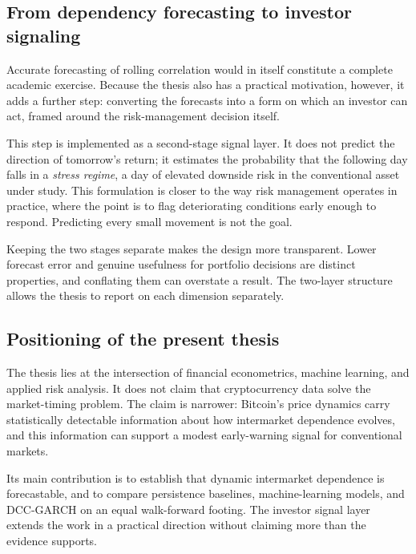 \subsection{From dependency forecasting to investor signaling}

Accurate forecasting of rolling correlation would in itself constitute a complete academic exercise. Because the thesis also has a practical motivation, however, it adds a further step: converting the forecasts into a form on which an investor can act, framed around the risk-management decision itself.

This step is implemented as a second-stage signal layer. It does not predict the direction of tomorrow's return; it estimates the probability that the following day falls in a \emph{stress regime}, a day of elevated downside risk in the conventional asset under study. This formulation is closer to the way risk management operates in practice, where the point is to flag deteriorating conditions early enough to respond. Predicting every small movement is not the goal.

Keeping the two stages separate makes the design more transparent. Lower forecast error and genuine usefulness for portfolio decisions are distinct properties, and conflating them can overstate a result. The two-layer structure allows the thesis to report on each dimension separately.

\subsection{Positioning of the present thesis}

The thesis lies at the intersection of financial econometrics, machine learning, and applied risk analysis. It does not claim that cryptocurrency data solve the market-timing problem. The claim is narrower: Bitcoin's price dynamics carry statistically detectable information about how intermarket dependence evolves, and this information can support a modest early-warning signal for conventional markets.

Its main contribution is to establish that dynamic intermarket dependence is forecastable, and to compare persistence baselines, machine-learning models, and DCC-GARCH on an equal walk-forward footing. The investor signal layer extends the work in a practical direction without claiming more than the evidence supports.
